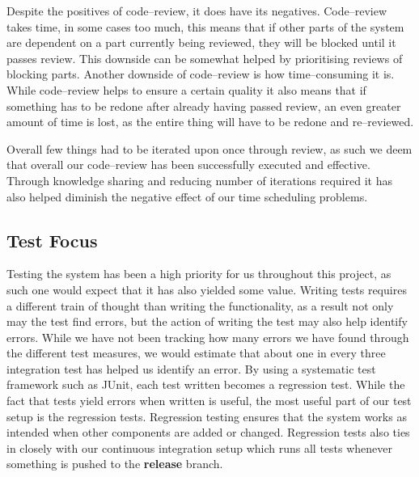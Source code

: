 \bigskip
Despite the positives of code--review, it does have its negatives.
Code--review takes time, in some cases too much, this means that if other parts of the system are dependent on a part currently being reviewed, they will be blocked until it passes review.
This downside can be somewhat helped by prioritising reviews of blocking parts.
Another downside of code--review is how time--consuming it is.
While code--review helps to ensure a certain quality it also means that if something has to be redone after already having passed review, an even greater amount of time is lost, as the entire thing will have to be redone and re--reviewed.

Overall few things had to be iterated upon once through review, as such we deem that overall our code--review has been successfully executed and effective.
Through knowledge sharing and reducing number of iterations required it has also helped diminish the negative effect of our time scheduling problems.
\subsection{Test Focus}
Testing the system has been a high priority for us throughout this project, as such one would expect that it has also yielded some value.
Writing tests requires a different train of thought than writing the functionality, as a result not only may the test find errors, but the action of writing the test may also help identify errors.
While we have not been tracking how many errors we have found through the different test measures, we would estimate that about one in every three integration test has helped us identify an error.
By using a systematic test framework such as JUnit, each test written becomes a regression test.
While the fact that tests yield errors when written is useful, the most useful part of our test setup is the regression tests.
Regression testing ensures that the system works as intended when other components are added or changed.
Regression tests also ties in closely with our continuous integration setup which runs all tests whenever something is pushed to the \textbf{release} branch.

